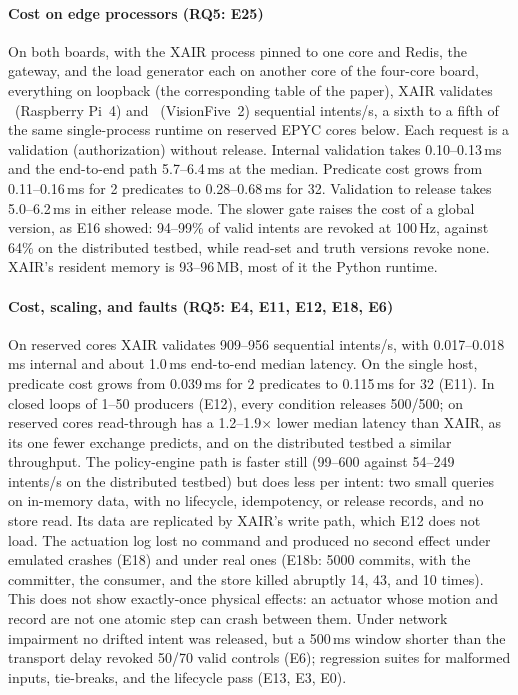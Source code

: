 \documentclass[11pt]{article}
\begin{document}
\paragraph{Cost on edge processors (RQ5: E25)}
On both boards, with the XAIR process pinned to one core and Redis, the gateway, and the load generator each on another core of the four-core board, everything on loopback (the corresponding table of the paper), XAIR validates \EmbPiIps\ (Raspberry Pi~4) and \EmbVfIps\ (VisionFive~2) sequential intents/s, a sixth to a fifth of the same single-process runtime on reserved EPYC cores below. Each request is a validation (authorization) without release. Internal validation takes 0.10--0.13\,ms and the end-to-end path 5.7--6.4\,ms at the median. Predicate cost grows from 0.11--0.16\,ms for 2 predicates to 0.28--0.68\,ms for 32. Validation to release takes 5.0--6.2\,ms in either release mode. The slower gate raises the cost of a global version, as E16 showed: 94--99\% of valid intents are revoked at 100\,Hz, against 64\% on the distributed testbed, while read-set and truth versions revoke none. XAIR's resident memory is 93--96\,MB, most of it the Python runtime.

\paragraph{Cost, scaling, and faults (RQ5: E4, E11, E12, E18, E6)}
On reserved cores XAIR validates 909--956 sequential intents/s, with 0.017--0.018\,ms internal and about 1.0\,ms end-to-end median latency. On the single host, predicate cost grows from 0.039\,ms for 2 predicates to 0.115\,ms for 32 (E11). In closed loops of 1--50 producers (E12), every condition releases 500/500; on reserved cores read-through has a 1.2--1.9$\times$ lower median latency than XAIR, as its one fewer exchange predicts, and on the distributed testbed a similar throughput. The policy-engine path is faster still (99--600 against 54--249 intents/s on the distributed testbed) but does less per intent: two small queries on in-memory data, with no lifecycle, idempotency, or release records, and no store read. Its data are replicated by XAIR's write path, which E12 does not load. The actuation log lost no command and produced no second effect under emulated crashes (E18) and under real ones (E18b: 5000 commits, with the committer, the consumer, and the store killed abruptly 14, 43, and 10 times). This does not show exactly-once physical effects: an actuator whose motion and record are not one atomic step can crash between them. Under network impairment no drifted intent was released, but a 500\,ms window shorter than the transport delay revoked 50/70 valid controls (E6); regression suites for malformed inputs, tie-breaks, and the lifecycle pass (E13, E3, E0).
\end{document}
